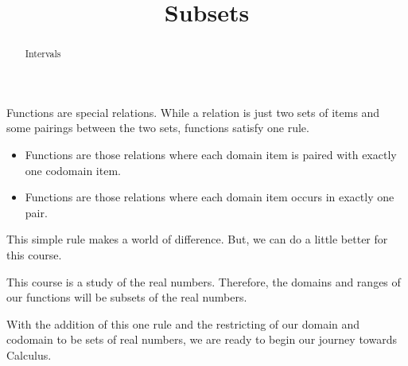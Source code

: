 \documentclass{ximera}
\title{Subsets}
\begin{document}
\begin{abstract}
Intervals
\end{abstract}
\maketitle




Functions are special relations. While a relation is just two sets of items and some pairings between the two sets, functions satisfy one rule. 

\begin{itemize}
\item Functions are those relations where each domain item is paired with exactly one codomain item.
\item Functions are those relations where each domain item occurs in exactly one pair.
\end{itemize}


This simple rule makes a world of difference. But, we can do a little better for this course.

This course is a study of the real numbers.  Therefore, the domains and ranges of our functions will be subsets of the real numbers.


With the addition of this one rule and the restricting of our domain and codomain to be sets of real numbers, we are ready to begin our journey towards Calculus.
\end{document}
